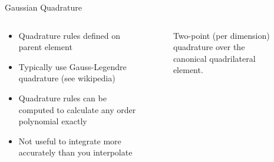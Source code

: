 \begin{frame}{Gaussian Quadrature}

  \begin{columns}
    \begin{column}{0.5\textwidth}
      \begin{itemize}
      \item
        Quadrature rules defined on parent element
      \item
        Typically use Gauss-Legendre quadrature (see wikipedia)
      \item
        Quadrature rules can be computed to calculate any order
        polynomial exactly
      \item
        Not useful to integrate more accurately than you interpolate
      \end{itemize}
    \end{column}
    \begin{column}{0.5\textwidth}
      \begin{figure}
        \centering
        \caption{
          Two-point (per dimension) quadrature over the canonical
          quadrilateral element.
        }
      \end{figure}
    \end{column}
  \end{columns}
  
\end{frame}


